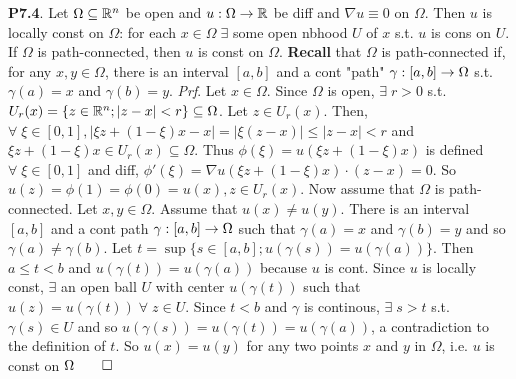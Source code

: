 {\bf P7.4}. Let $\Omega \subseteq \mathbb{R}^n$ be open and $u: \Omega \rightarrow \mathbb{R}$ be diff and $\nabla u \equiv 0$ on $\Omega$. Then $u$ is locally const on $\Omega$: for each $x \in \Omega \; \exists$  some open nbhood $U$ of $x$ s.t. $u$ is cons on $U$. If $\Omega$ is path-connected, then $u$ is const on $\Omega$.
\textbf{Recall} that $\Omega$ is path-connected if, for any $x, y \in \Omega$, there is an interval $[a,b]$ and a cont "path" $\gamma: [a,b] \rightarrow \Omega$ s.t. $\gamma(a) = x$ and $\gamma(b)=y$. 
{\it Prf}. Let $x \in \Omega$. Since $\Omega$ is open, $\exists \; r > 0$ s.t. $U_r(x) = \{z \in \mathbb{R}^n; |z-x|<r \} \subseteq \Omega$.
Let $z \in U_r(x)$. Then, $\forall \; \xi \in [0,1], |\xi z + (1-\xi)x - x|=|\xi(z-x)| \leq |z-x| < r$ and $\xi z + (1 - \xi)x \in U_r(x) \subseteq \Omega$. Thus $\phi(\xi) = u(\xi z + ( 1- \xi)x)$ is defined $\forall \; \xi \in [0,1]$ and diff, $\phi'(\xi) = \nabla u (\xi z + (1-\xi)x) \cdot (z - x) = 0$. So $u(z) = \phi(1) = \phi(0) = u(x), z \in U_r(x)$. Now assume that $\Omega$ is path-connected. Let $x,y \in \Omega$. Assume that $u(x) \neq u(y)$. There is an interval $[a,b]$ and a cont path $\gamma : [a,b] \rightarrow \Omega$ such that $\gamma(a) = x$ and $\gamma(b)=y$ and so $\gamma(a) \neq \gamma(b)$. Let $t = \sup\{s \in [a,b]; u(\gamma(s))=u(\gamma(a))\}$. Then $a \leq t < b$ and $u(\gamma(t))=u(\gamma(a))$ because $u$ is cont. Since $u$ is locally const, $\exists$ an open ball $U$ with center $u(\gamma(t))$ such that $u(z) = u(\gamma(t))\; \forall \; z \in U$. Since $t < b$ and $\gamma$ is continous, $\exists \; s >t$ s.t. $\gamma(s) \in U$ and so $u(\gamma(s)) = u(\gamma(t)) = u(\gamma(a))$, a contradiction to the definition of $t$.  So $u(x) = u(y)$ for any two points $x$ and $y$ in $\Omega$, i.e. $u$ is const on $\Omega \qed$